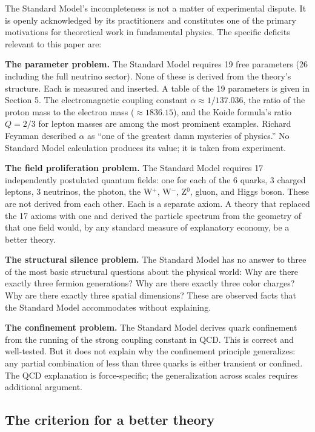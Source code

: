 \documentclass[12pt]{article}
\begin{document}
The Standard Model's incompleteness is not a matter of experimental
dispute. It is openly acknowledged by its practitioners and constitutes
one of the primary motivations for theoretical work in fundamental
physics. The specific deficits relevant to this paper are:

\textbf{The parameter problem.} The Standard Model requires 19 free
parameters (26 including the full neutrino sector). None of these is
derived from the theory's structure. Each is measured and inserted. A
table of the 19 parameters is given in Section 5. The electromagnetic
coupling constant \(\alpha \approx 1/137.036\), the ratio of the proton
mass to the electron mass (\(\approx 1836.15\)), and the Koide formula's
ratio \(Q = 2/3\) for lepton masses are among the most prominent
examples. Richard Feynman described \(\alpha\) as ``one of the greatest
damn mysteries of physics.'' No Standard Model calculation produces its
value; it is taken from experiment.

\textbf{The field proliferation problem.} The Standard Model requires 17
independently postulated quantum fields: one for each of the 6 quarks, 3
charged leptons, 3 neutrinos, the photon, the W\(^+\), W\(^-\), Z\(^0\),
gluon, and Higgs boson. These are not derived from each other. Each is a
separate axiom. A theory that replaced the 17 axioms with one and
derived the particle spectrum from the geometry of that one field would,
by any standard measure of explanatory economy, be a better theory.

\textbf{The structural silence problem.} The Standard Model has no
answer to three of the most basic structural questions about the
physical world: Why are there exactly three fermion generations? Why are
there exactly three color charges? Why are there exactly three spatial
dimensions? These are observed facts that the Standard Model
accommodates without explaining.

\textbf{The confinement problem.} The Standard Model derives quark
confinement from the running of the strong coupling constant in QCD.
This is correct and well-tested. But it does not explain why the
confinement principle generalizes: any partial combination of less than
three quarks is either transient or confined. The QCD explanation is
force-specific; the generalization across scales requires additional
argument.

\subsection{The criterion for a better theory}\label{the-criterion-for-a-better-theory}
\end{document}
